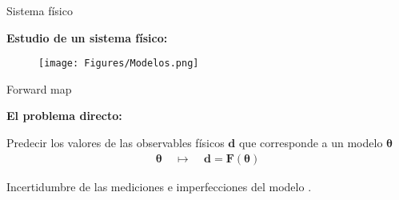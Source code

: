 \documentclass[10pt,aspectratio=169]{beamer}
\begin{document}
\begin{frame}[fragile]{Sistema físico}

  \textbf{Estudio de un sistema físico:}
  \begin{figure}[H] 
      \centering 
      \texttt{[image: Figures/Modelos.png]} 
  \end{figure} 

\end{frame}

\begin{frame}[fragile]{Forward map}
  
  \textbf{El problema directo:}
  
  Predecir los valores de las observables físicos $\mathbf{d}$ que corresponde a un modelo $\boldsymbol{\theta}$
  \begin{align*}
      \boldsymbol{\theta} \:\:\:\:\: \mapsto \:\:\:\:\: \mathbf{d} = \mathbf{F(\boldsymbol{\theta})}
  \end{align*}


  \vspace*{1 cm}

  Incertidumbre de las mediciones e imperfecciones del modelo \cite{tarantola2005inverse}. 

\end{frame}
\end{document}
